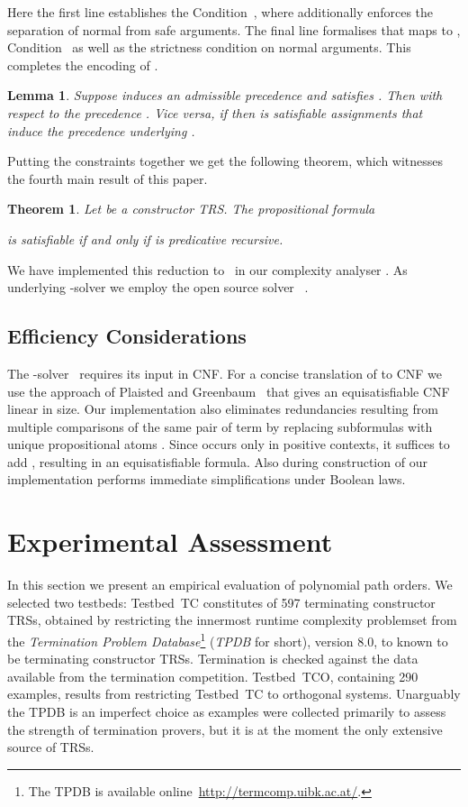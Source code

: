 \documentclass{LMCS}
\newtheorem{theorem}[thm]{Theorem}
\newtheorem{lemma}[thm]{Lemma}
\begin{document}
Here the first line establishes the Condition~, where
 additionally enforces the separation of normal from safe arguments.
The final line formalises
that  maps  to , Condition~
as well as the strictness condition on normal arguments.
This completes the encoding of .

\begin{lemma}
  Suppose  induces an admissible precedence  and satisfies . 
  Then  with respect to the precedence .
  Vice versa, if  then  is satisfiable assignments  
  that induce the precedence underlying .
\end{lemma}

Putting the constraints together we get the following theorem,
which witnesses the fourth main result of this paper.
\begin{theorem}
  Let  be a constructor TRS.\@ 
  The propositional formula 
  
  is satisfiable if and only if  is predicative recursive.
\end{theorem}

We have implemented this reduction to \SAT~in our complexity analyser \TCT.\@
As underlying \SAT-solver we employ the open source solver \minisat~\cite{ES03}.


\subsection{Efficiency Considerations}
The \SAT-solver \minisat\ requires its input in CNF.\@
For a concise translation of  to CNF 
we use the approach of Plaisted and Greenbaum~\cite{PG86} that 
gives an equisatisfiable CNF linear in size.
Our implementation also eliminates redundancies resulting from 
multiple comparisons of the same pair of term  by 
replacing subformulas  with unique 
propositional atoms . Since  
occurs only in positive contexts, it suffices to 
add , resulting in an equisatisfiable formula.
Also during construction of  our implementation
performs immediate simplifications under Boolean laws.





\section{Experimental Assessment}\label{s:exps}

In this section we present an empirical evaluation of polynomial path orders.
We selected two testbeds: Testbed~\textsf{TC} constitutes 
of 597 terminating constructor TRSs, obtained
by restricting the innermost runtime complexity problemset 
from the \emph{Termination Problem Database}\footnote{The TPDB is available online~\url{http://termcomp.uibk.ac.at/}.} 
(\emph{TPDB} for short), version 8.0,
to known to be terminating constructor TRSs.
Termination is checked against the data available from the termination competition.
Testbed~\textsf{TCO}, containing 290 examples, results from restricting Testbed~\textsf{TC} to 
orthogonal systems.
Unarguably the TPDB is an imperfect choice as examples were collected primarily to 
assess the strength of termination provers, but it is at the moment the only 
extensive source of TRSs. 
\end{document}
